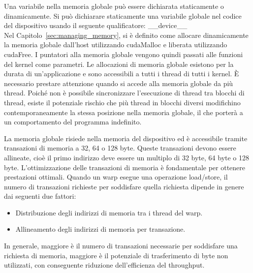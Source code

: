 Una variabile nella memoria globale può essere dichiarata staticamente o dinamicamente. Si può dichiarare staticamente una variabile globale nel codice del dispositivo usando il seguente qualificatore:
\_\_device\_\_\\

Nel Capitolo~\ref{sec:managing_memory}, si è definito come allocare dinamicamente la memoria globale dall'host utilizzando cudaMalloc e liberata utilizzando cudaFree. I puntatori alla memoria globale vengono quindi passati alle funzioni del kernel come parametri. Le allocazioni di memoria globale esistono per la durata di un'applicazione e sono accessibili a tutti i thread di tutti i kernel. È necessario prestare attenzione quando si accede alla memoria globale da più thread. Poiché non è possibile sincronizzare l'esecuzione di thread tra blocchi di thread, esiste il potenziale rischio che più thread in blocchi diversi modifichino contemporaneamente la stessa posizione nella memoria globale, il che porterà a un comportamento del programma indefinito.

La memoria globale risiede nella memoria del dispositivo ed è accessibile tramite transazioni di memoria a 32, 64 o 128 byte. Queste transazioni devono essere allineate, cioè il primo indirizzo deve essere un multiplo di 32 byte, 64 byte o 128 byte. L'ottimizzazione delle transazioni di memoria è fondamentale per ottenere prestazioni ottimali. Quando un warp esegue una operazione load/store, il numero di transazioni richieste per soddisfare quella richiesta dipende in genere dai seguenti due fattori:
\begin{itemize}
	\item Distribuzione degli indirizzi di memoria tra i thread del warp.
	\item Allineamento degli indirizzi di memoria per transazione.
\end{itemize}
In generale, maggiore è il numero di transazioni necessarie per soddisfare una richiesta di memoria, maggiore è il potenziale di trasferimento di byte non utilizzati, con conseguente riduzione dell'efficienza del throughput.
